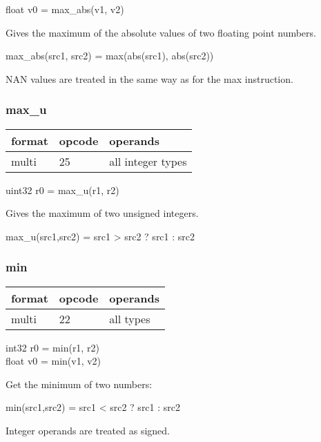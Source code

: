 \documentclass[forwardcom.tex]{subfiles}
\begin{document}
float v0 = max\_abs(v1, v2)
\vspace{2mm}

Gives the maximum of the absolute values of two floating point numbers.
\vspace{2mm}

max\_abs(src1, src2) = max(abs(src1), abs(src2))
\vspace{2mm}

NAN values are treated in the same way as for the max instruction.

\subsubsection{max\_u}
\label{table:maxUInstruction}
\begin{tabular}{|p{12mm}|p{12mm}|p{110mm}|}
\hline
\bfseries format & \bfseries opcode & \bfseries operands \\ \hline
multi & 25 & all integer types \\ \hline
\end{tabular}
\vspace{2mm}

uint32 r0 = max\_u(r1, r2)
\vspace{2mm}

Gives the maximum of two unsigned integers.
\vspace{2mm}

max\_u(src1,src2) = src1 \textgreater{} src2 ? src1 : src2

\subsubsection{min}
\label{table:minInstruction}
\begin{tabular}{|p{12mm}|p{12mm}|p{110mm}|}
\hline
\bfseries format & \bfseries opcode & \bfseries operands \\ \hline
multi & 22 & all types \\ \hline
\end{tabular}
\vspace{2mm}

int32 r0 = min(r1, r2)\\
float v0 = min(v1, v2)
\vspace{2mm}

Get the minimum of two numbers:

min(src1,src2) = src1 \textless{} src2 ? src1 : src2
\vspace{2mm}

Integer operands are treated as signed.
\vspace{2mm}
\end{document}
